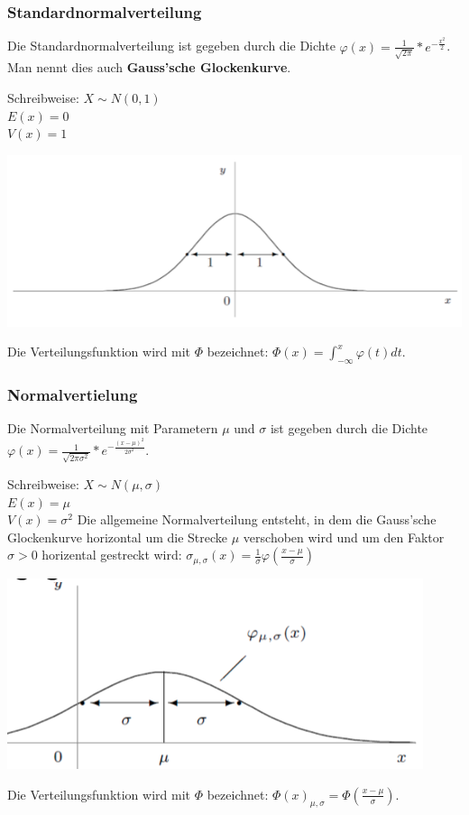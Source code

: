 \documentclass[10pt]{article}
\newtheorem[M]{definition}{Def.}
\newtheorem[M]{satz}{Satz}
\numberwithin{equation}{section}
\begin{document}
\subsubsection{Standardnormalverteilung}
\begin{definition}[Standardnormalverteilung]
Die Standardnormalverteilung ist gegeben durch die Dichte $\varphi(x) = \frac{1}{\sqrt{2\pi}}*e^{-\frac{x^2}{2}}$. Man nennt dies auch \textbf{Gauss'sche Glockenkurve}.
\end{definition}
Schreibweise: $X \sim N(0,1)$ \\
$E(x) = 0$ \\
$V(x) = 1$
\begin{center}
	\includegraphics[scale=0.4]{standardnormalverteilung.png}
\end{center}
Die Verteilungsfunktion wird mit $\Phi$ bezeichnet: $\Phi(x) = \int_{-\infty}^x \varphi(t) dt$.
\subsubsection{Normalvertielung}
\begin{definition}[Normalverteilung]
Die Normalverteilung mit Parametern $\mu$ und $\sigma$ ist gegeben durch die Dichte $\varphi(x) = \frac{1}{\sqrt{2\pi\sigma^2}}*e^{-\frac{(x-\mu)^2}{2\sigma^2}}$.
\end{definition}
Schreibweise: $X \sim N(\mu,\sigma)$ \\
$E(x) = \mu$ \\
$V(x) = \sigma^2$
Die allgemeine Normalverteilung entsteht, in dem die Gauss'sche Glockenkurve horizontal um die Strecke $\mu$ verschoben wird und um den Faktor $\sigma>0$  horizental gestreckt wird: $\sigma_{\mu,\sigma}(x)=\frac{1}{\sigma}\varphi(\frac{x - \mu}{\sigma})$
\begin{center}
	\includegraphics[scale=0.4]{normalvertielung.png}
\end{center}
Die Verteilungsfunktion wird mit $\Phi$ bezeichnet: $\Phi(x)_{\mu,\sigma} = \Phi(\frac{x-\mu}{\sigma})$.
\end{document}
